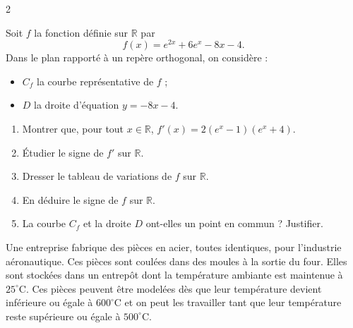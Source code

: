 \documentclass[a4paper,12pt]{article}
\begin{document}
\begin{multicols}{2}
  \begin{exercice}[title=Exercice 10 $\star\star$ { [Représenter, Calculer] }]{}{}
    Soit $f$ la fonction définie sur $\mathbb{R}$ par 
    \[
    f(x)=e^{2x}+6e^{x}-8x-4.
    \]
    Dans le plan rapporté à un repère orthogonal, on considère :
    \begin{itemize}
      \item $C_f$ la courbe représentative de $f$ ;
      \item $D$ la droite d’équation $y=-8x-4$.
    \end{itemize}
    \begin{enumerate}
      \item Montrer que, pour tout $x\in\mathbb{R}$, $f'(x)=2(e^x-1)(e^x+4)$.
      \item Étudier le signe de $f'$ sur $\mathbb{R}$.
      \item Dresser le tableau de variations de $f$ sur $\mathbb{R}$.
      \item En déduire le signe de $f$ sur $\mathbb{R}$.
      \item La courbe $C_f$ et la droite $D$ ont-elles un point en commun ? Justifier.
    \end{enumerate}
    \end{exercice}
    
    \begin{exercice}[title=Exercice 11 $\star\star$ { [Modéliser, Calculer, Représenter] }]{}{}
    Une entreprise fabrique des pièces en acier, toutes identiques, pour l’industrie aéronautique. Ces pièces sont coulées dans des moules à la sortie du four. Elles sont stockées dans un entrepôt dont la température ambiante est maintenue à $25^\circ\mathrm{C}$. Ces pièces peuvent être modelées dès que leur température devient inférieure ou égale à $600^\circ\mathrm{C}$ et on peut les travailler tant que leur température reste supérieure ou égale à $500^\circ\mathrm{C}$.  
    

\end{exercice}
\end{multicols}
\end{document}
